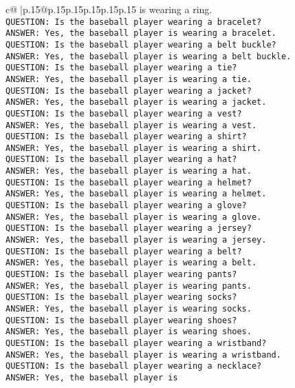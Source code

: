 \documentclass{article}
\begin{document}
{\begin{supertabular}{c@{$\;$}|p{.15\linewidth}@{}p{.15\linewidth}p{.15\linewidth}p{.15\linewidth}p{.15\linewidth}p{.15\linewidth}}
{{{is wearing a ring.\\ \tt QUESTION: Is the baseball player wearing a bracelet?\\ \tt ANSWER: Yes, the baseball player is wearing a bracelet.\\ \tt QUESTION: Is the baseball player wearing a belt buckle?\\ \tt ANSWER: Yes, the baseball player is wearing a belt buckle.\\ \tt QUESTION: Is the baseball player wearing a tie?\\ \tt ANSWER: Yes, the baseball player is wearing a tie.\\ \tt QUESTION: Is the baseball player wearing a jacket?\\ \tt ANSWER: Yes, the baseball player is wearing a jacket.\\ \tt QUESTION: Is the baseball player wearing a vest?\\ \tt ANSWER: Yes, the baseball player is wearing a vest.\\ \tt QUESTION: Is the baseball player wearing a shirt?\\ \tt ANSWER: Yes, the baseball player is wearing a shirt.\\ \tt QUESTION: Is the baseball player wearing a hat?\\ \tt ANSWER: Yes, the baseball player is wearing a hat.\\ \tt QUESTION: Is the baseball player wearing a helmet?\\ \tt ANSWER: Yes, the baseball player is wearing a helmet.\\ \tt QUESTION: Is the baseball player wearing a glove?\\ \tt ANSWER: Yes, the baseball player is wearing a glove.\\ \tt QUESTION: Is the baseball player wearing a jersey?\\ \tt ANSWER: Yes, the baseball player is wearing a jersey.\\ \tt QUESTION: Is the baseball player wearing a belt?\\ \tt ANSWER: Yes, the baseball player is wearing a belt.\\ \tt QUESTION: Is the baseball player wearing pants?\\ \tt ANSWER: Yes, the baseball player is wearing pants.\\ \tt QUESTION: Is the baseball player wearing socks?\\ \tt ANSWER: Yes, the baseball player is wearing socks.\\ \tt QUESTION: Is the baseball player wearing shoes?\\ \tt ANSWER: Yes, the baseball player is wearing shoes.\\ \tt QUESTION: Is the baseball player wearing a wristband?\\ \tt ANSWER: Yes, the baseball player is wearing a wristband.\\ \tt QUESTION: Is the baseball player wearing a necklace?\\ \tt ANSWER: Yes, the baseball player is }}}
\end{supertabular}}
\end{document}
